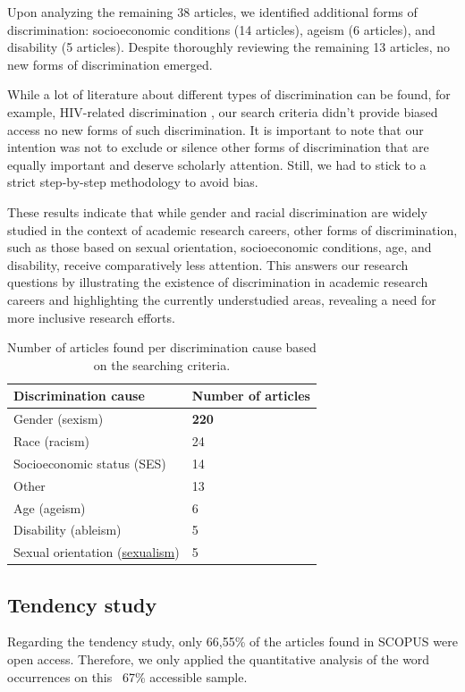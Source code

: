 \documentclass[runningheads]{llncs}
\begin{document}
Upon analyzing the remaining 38 articles, we identified additional forms of discrimination: socioeconomic conditions (14 articles), ageism (6 articles), and disability (5 articles). Despite thoroughly reviewing the remaining 13 articles, no new forms of discrimination emerged.

While a lot of literature about different types of discrimination can be found, for example, HIV-related discrimination \cite{Murariu2021}, our search criteria didn't provide biased access no new forms of such discrimination. It is important to note that our intention was not to exclude or silence other forms of discrimination that are equally important and deserve scholarly attention. Still, we had to stick to a strict step-by-step methodology to avoid bias.

These results indicate that while gender and racial discrimination are widely studied in the context of academic research careers, other forms of discrimination, such as those based on sexual orientation, socioeconomic conditions, age, and disability, receive comparatively less attention. This answers our research questions by illustrating the existence of discrimination in academic research careers and highlighting the currently understudied areas, revealing a need for more inclusive research efforts.


\begin{table}
\caption{Number of articles found per discrimination cause based on the searching criteria.}\label{tab1}
\centering
\begin{tabular}{|l|l|}
\hline
Discrimination cause & Number of articles\\
\hline
Gender (sexism) & \textbf{220} \\
Race (racism) & 24 \\
Socioeconomic status (SES) & 14 \\
Other & 13 \\
Age (ageism) & 6 \\
Disability (ableism) & 5 \\
Sexual orientation (\href{https://www.collinsdictionary.com/dictionary/english/sexualism}{sexualism}) & 5 \\ 
\hline
\end{tabular}
\end{table}

\subsection{Tendency study}
Regarding the tendency study, only 66,55\% of the articles found in SCOPUS were open access. Therefore, we only applied the quantitative analysis of the word occurrences on this ~67\% accessible sample.
\end{document}
